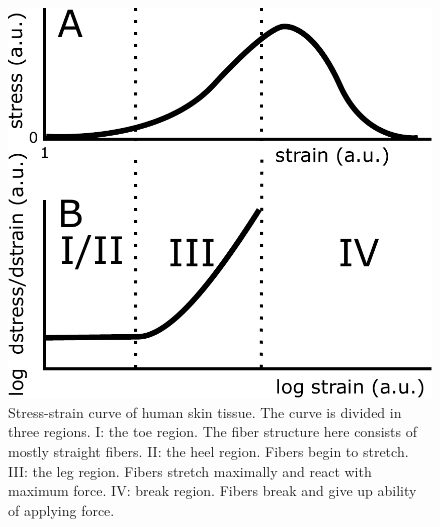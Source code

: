 \begin{figure}
    \centering
    \includegraphics[width=\linewidth]{skinstression/images/stress-strain-curve.pdf}
    \caption[Stress-strain curve of human skin tissue]{
        Stress-strain curve of human skin tissue.
        The curve is divided in three regions.
        I: the toe region.
        The fiber structure here consists of mostly straight fibers.
        II: the heel region.
        Fibers begin to stretch.
        III: the leg region.
        Fibers stretch maximally and react with maximum force.
        IV: break region.
        Fibers break and give up ability of applying force.
    }
    \label{fig:stress-strain-curve-skin-tissue}
\end{figure}

